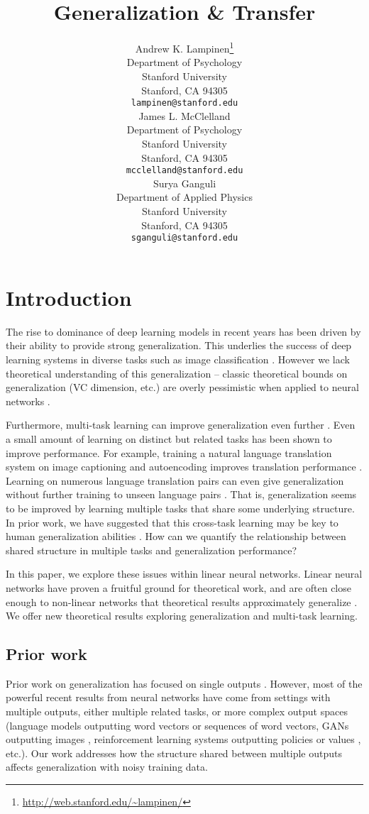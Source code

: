 \documentclass{article}
\title{Generalization \& Transfer}
\author{
  Andrew K. Lampinen\thanks{\url{http://web.stanford.edu/~lampinen/}} \\
  Department of Psychology\\
  Stanford University \\
  Stanford, CA 94305 \\
  \texttt{lampinen@stanford.edu} \\
  \And
  James L. McClelland \\
  Department of Psychology\\
  Stanford University \\
  Stanford, CA 94305 \\
  \texttt{mcclelland@stanford.edu} \\
  \And
  Surya Ganguli \\
  Department of Applied Physics\\
  Stanford University \\
  Stanford, CA 94305 \\
  \texttt{sganguli@stanford.edu} \\
}
\begin{document}

\maketitle

\begin{abstract}
\end{abstract}

\section{Introduction}

The rise to dominance of deep learning models in recent years has been driven by their ability to provide strong generalization. This underlies the success of deep learning systems in diverse tasks such as image classification \cite{}. However we lack theoretical understanding of this generalization -- classic theoretical bounds on generalization (VC dimension, etc.) are overly pessimistic when applied to neural networks \citep{Zhang2016, Advani2017}. \par 
Furthermore, multi-task learning can improve generalization even further \cite[e.g.]{Dong2015,Rusu2015}. Even a small amount of learning on distinct but related tasks has been shown to improve performance. For example, training a natural language translation system on image captioning and autoencoding improves translation performance \citep{Luong2016}. Learning on numerous language translation pairs can even give generalization without further training to unseen language pairs \citep{Johnson2016a}. That is, generalization seems to be improved by learning multiple tasks that share some underlying structure. In prior work, we have suggested that this cross-task learning may be key to human generalization abilities \citep{Hansen2017}. How can we quantify the relationship between shared structure in multiple tasks and generalization performance? \par 
In this paper, we explore these issues within linear neural networks. Linear neural networks have proven a fruitful ground for theoretical work, and are often close enough to non-linear networks that theoretical results approximately generalize \cite[e.g.]{Saxe2013, Advani2017}. We offer new theoretical results exploring generalization and multi-task learning. \par
\subsection{Prior work}
Prior work on generalization has focused on single outputs \cite[e.g.]{Advani2017}. However, most of the powerful recent results from neural networks have come from settings with multiple outputs, either multiple related tasks, or more complex output spaces (language models outputting word vectors or sequences of word vectors, GANs outputting images \cite{Goodfellow2014}, reinforcement learning systems outputting policies or values \cite{Mnih2015, Silver2016}, etc.). Our work addresses how the structure shared between multiple outputs affects generalization with noisy training data. \par 
\end{document}
